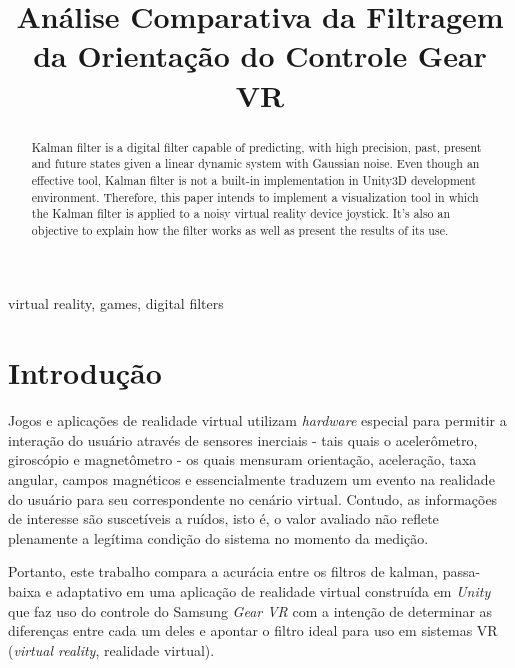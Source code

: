 \documentclass[conference]{IEEEtran}
\begin{document}
\title{Análise Comparativa da Filtragem da Orientação do Controle Gear VR}

\author{
}

\maketitle

\begin{abstract}
Kalman filter is a digital filter capable of predicting, with high precision, past, present and future states given a linear dynamic system with Gaussian noise. Even though an effective tool, Kalman filter is not a built-in implementation in Unity3D development environment. Therefore, this paper intends to implement  a visualization tool in which the Kalman filter is applied to a noisy virtual reality device joystick. It's also an objective to explain how the filter works as well as present the results of its use.
\end{abstract}

\begin{IEEEkeywords}
virtual reality, games, digital filters
\end{IEEEkeywords}

\section{Introdução}
Jogos e aplicações de realidade virtual utilizam \textit{hardware} especial para permitir a interação do usuário através de sensores inerciais - tais quais o acelerômetro, giroscópio e magnetômetro - os quais mensuram orientação, aceleração, taxa angular, campos magnéticos e essencialmente traduzem um evento na realidade do usuário para seu correspondente no cenário virtual. Contudo, as informações de interesse são suscetíveis a ruídos, isto é, o valor avaliado não reflete plenamente a legítima condição do sistema no momento da medição.

Portanto, este trabalho compara a acurácia entre os filtros de kalman, passa-baixa e adaptativo em uma aplicação de realidade virtual construída em \textit{Unity} que faz uso do controle do Samsung \textit{Gear VR} com a intenção de determinar as diferenças entre cada um deles e apontar o filtro ideal para uso em sistemas VR (\textit{virtual reality}, realidade virtual).
\end{document}
